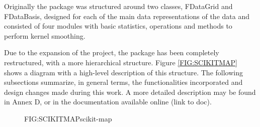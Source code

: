 
Originally the package was structured around two classes, FDataGrid and
FDataBasis, designed for each of the main data representations of the data and
consisted of four modules with basic statistics, operations and methods to
perform kernel smoothing.

Due to the expansion of the project, the package has been completely
restructured, with a more hierarchical structure. Figure \ref{FIG:SCIKITMAP}
shows a diagram with a high-level description of this structure. The following
subsections summarize, in general terms, the functionalities incorporated and
design changes made during this work. A more detailed description may be found
in Annex D, or in the documentation available online (link to doc).

\begin{figure}[scikit-map]{FIG:SCIKITMAP}{scikit-map}
\end{figure}
